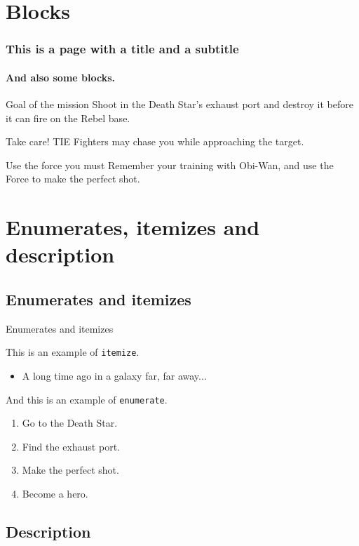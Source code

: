 \documentclass[usenames,dvipsnames,10pt,aspectratio=169]{beamer}
\begin{document}
\section{Blocks}

\begin{frame} 
\frametitle{This is a page with a title and a subtitle} 
\framesubtitle{And also some blocks.} 
\begin{block}{Goal of the mission}
Shoot in the Death Star's exhaust port and destroy it before it can fire on the Rebel base.
\end{block} 
\begin{alertblock}{Take care!}
TIE Fighters may chase you while approaching the target.
\end{alertblock} 
\begin{exampleblock}{Use the force you must}
Remember your training with Obi-Wan, and use the Force to make the perfect shot.
\end{exampleblock} 

\end{frame}

\section{Enumerates, itemizes and description}

\subsection{Enumerates and itemizes}


\begin{frame}{Enumerates and itemizes}

This is an example of \texttt{itemize}.
\begin{itemize}
	\item A long time ago in a galaxy far, far away...
\end{itemize}
And this is an example of \texttt{enumerate}.

\begin{enumerate} 
  \item Go to the Death Star.
  \item Find the exhaust port.
  \item Make the perfect shot.
  \item Become a hero.
\end{enumerate}
\end{frame}

\subsection{Description}
\end{document}
